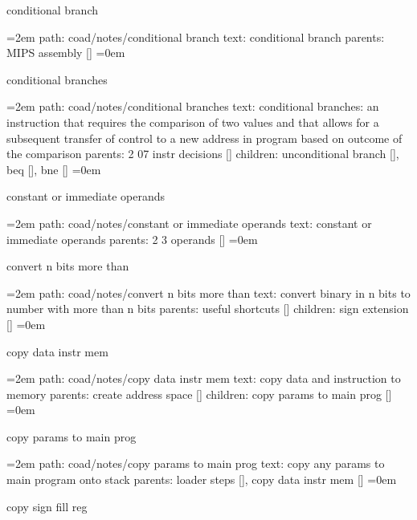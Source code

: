 \bigskip
{}
conditional branch
\smallskip
\par\begingroup
\leftskip=2em
path: coad/notes/conditional branch
\smallskip
text:  conditional branch
\smallskip
parents:  MIPS assembly []
\smallskip
\leftskip=0em
\par\endgroup
\bigskip
{}
conditional branches
\smallskip
\par\begingroup
\leftskip=2em
path: coad/notes/conditional branches
\smallskip
text:  conditional branches: an instruction that requires the comparison of two values and that allows for a subsequent transfer of control to a new address in program based on outcome of the comparison
\smallskip
parents:  2 07 instr decisions []
\smallskip
children: unconditional branch [], beq [], bne []
\smallskip
\leftskip=0em
\par\endgroup
\bigskip
{}
constant or immediate operands
\smallskip
\par\begingroup
\leftskip=2em
path: coad/notes/constant or immediate operands
\smallskip
text:  constant or immediate operands
\smallskip
parents:  2 3 operands []
\smallskip
\leftskip=0em
\par\endgroup
\bigskip
{}
convert n bits more than
\smallskip
\par\begingroup
\leftskip=2em
path: coad/notes/convert n bits more than
\smallskip
text:  convert binary in n bits to number with more than n bits
\smallskip
parents:  useful shortcuts []
\smallskip
children: sign extension []
\smallskip
\leftskip=0em
\par\endgroup
\bigskip
{}
copy data instr mem
\smallskip
\par\begingroup
\leftskip=2em
path: coad/notes/copy data instr mem
\smallskip
text:  copy data and instruction to memory
\smallskip
parents:  create address space []
\smallskip
children: copy params to main prog []
\smallskip
\leftskip=0em
\par\endgroup
\bigskip
{}
copy params to main prog
\smallskip
\par\begingroup
\leftskip=2em
path: coad/notes/copy params to main prog
\smallskip
text:  copy any params to main program onto stack
\smallskip
parents:  loader steps [], copy data instr mem []
\smallskip
\leftskip=0em
\par\endgroup
\bigskip
{}
copy sign fill reg
\smallskip
\par\begingroup
